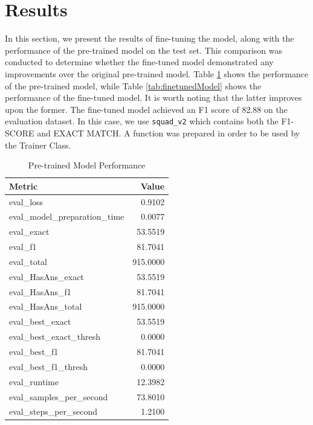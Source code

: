 \documentclass[runningheads]{llncs}
\begin{document}
\section{Results}
\label{sec:results}

In this section, we present the results of fine-tuning the model,
along with the performance of the pre-trained model on the test
set. This comparison was conducted to determine whether the fine-tuned
model demonstrated any improvements over the original pre-trained
model. Table \ref{tab:before-performance} shows the performance of the
pre-trained model, while Table \ref{tab:finetunedModel} shows the
performance of the fine-tuned model. It is worth noting that the
latter improves upon the former. The fine-tuned model achieved an F1
score of 82.88 on the evaluation dataset. In this case, we use
\texttt{squad\_{v2}} which contains both the F1-SCORE and EXACT MATCH. A
function was prepared in order to be used by the Trainer Class.
\begin{table}
  \centering
  \caption{Pre-trained Model Performance}
  \label{tab:before-performance}
  \scriptsize
  \begin{tabular}{lr}
\toprule
Metric & Value \\
\midrule
eval\_loss & 0.9102 \\
eval\_model\_preparation\_time & 0.0077 \\
eval\_exact & 53.5519 \\
eval\_f1 & 81.7041 \\
eval\_total & 915.0000 \\
eval\_HasAns\_exact & 53.5519 \\
eval\_HasAns\_f1 & 81.7041 \\
eval\_HasAns\_total & 915.0000 \\
eval\_best\_exact & 53.5519 \\
eval\_best\_exact\_thresh & 0.0000 \\
eval\_best\_f1 & 81.7041 \\
eval\_best\_f1\_thresh & 0.0000 \\
eval\_runtime & 12.3982 \\
eval\_samples\_per\_second & 73.8010 \\
eval\_steps\_per\_second & 1.2100 \\
\bottomrule
\end{tabular}

\end{table}
\end{document}
